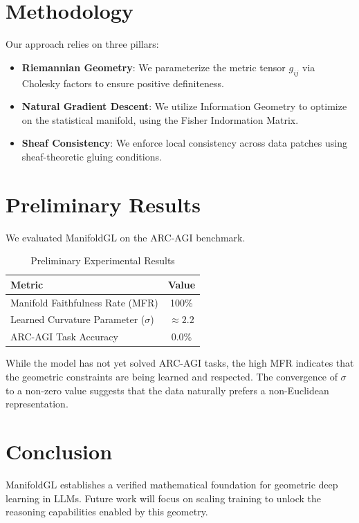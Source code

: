 \documentclass{article}
\begin{document}
\section{Methodology}
Our approach relies on three pillars:
\begin{itemize}
    \item \textbf{Riemannian Geometry}: We parameterize the metric tensor $g_{ij}$ via Cholesky factors to ensure positive definiteness.
    \item \textbf{Natural Gradient Descent}: We utilize Information Geometry to optimize on the statistical manifold, using the Fisher Indormation Matrix.
    \item \textbf{Sheaf Consistency}: We enforce local consistency across data patches using sheaf-theoretic gluing conditions.
\end{itemize}

\section{Preliminary Results}
We evaluated ManifoldGL on the ARC-AGI benchmark.

\begin{table}[h]
    \centering
    \begin{tabular}{lc}
        \hline
        \textbf{Metric} & \textbf{Value} \\
        \hline
        Manifold Faithfulness Rate (MFR) & 100\% \\
        Learned Curvature Parameter ($\sigma$) & $\approx 2.2$ \\
        ARC-AGI Task Accuracy & 0.0\% \\
        \hline
    \end{tabular}
    \caption{Preliminary Experimental Results}
    \label{tab:results}
\end{table}

While the model has not yet solved ARC-AGI tasks, the high MFR indicates that the geometric constraints are being learned and respected. The convergence of $\sigma$ to a non-zero value suggests that the data naturally prefers a non-Euclidean representation.

\section{Conclusion}
ManifoldGL establishes a verified mathematical foundation for geometric deep learning in LLMs. Future work will focus on scaling training to unlock the reasoning capabilities enabled by this geometry.



\end{document}
